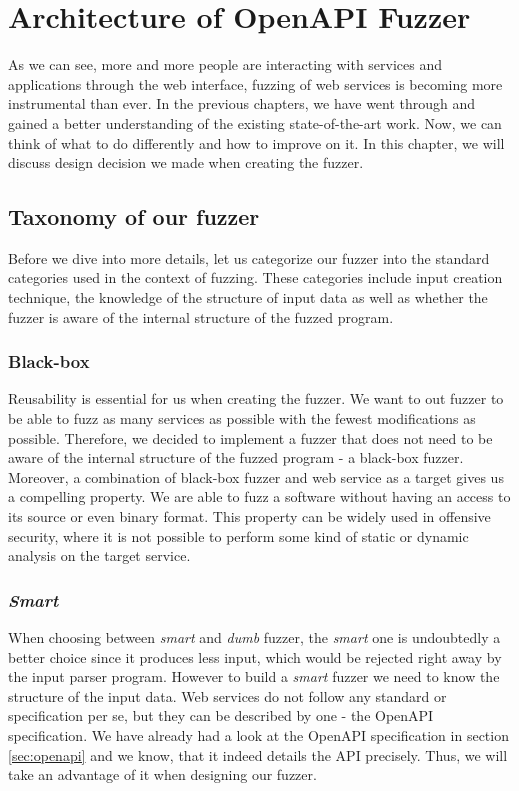 \chapter{Architecture of OpenAPI Fuzzer}
As we can see, more and more people are interacting with services and applications through the web interface, fuzzing of web services is becoming more instrumental than ever. In the previous chapters, we have went through and gained a better understanding of the existing state-of-the-art work. Now, we can think of what to do differently and how to improve on it. In this chapter, we will discuss design decision we made when creating the fuzzer.

\section{Taxonomy of our fuzzer}
Before we dive into more details, let us categorize our fuzzer into the standard categories used in the context of fuzzing. These categories include input creation technique, the knowledge of the structure of input data as well as whether the fuzzer is aware of the internal structure of the fuzzed program.

\subsection{Black-box}
Reusability is essential for us when creating the fuzzer. We want to out fuzzer to be able to fuzz as many services as possible with the fewest modifications as possible. Therefore, we decided to implement a fuzzer that does not need to be aware of the internal structure of the fuzzed program - a black-box fuzzer. Moreover, a combination of black-box fuzzer and web service as a target gives us a compelling property. We are able to fuzz a software without having an access to its source or even binary format. This property can be widely used in offensive security, where it is not possible to perform some kind of static or dynamic analysis on the target service.

\subsection{\textit{Smart}}
When choosing between \textit{smart} and \textit{dumb} fuzzer, the \textit{smart} one is undoubtedly a better choice since it produces less input, which would be rejected right away by the input parser program. However to build a \textit{smart} fuzzer we need to know the structure of the input data. Web services do not follow any standard or specification per se, but they can be described by one - the OpenAPI specification. We have already had a look at the OpenAPI specification in section \ref{sec:openapi} and we know, that it indeed details the API precisely. Thus, we will take an advantage of it when designing our fuzzer.


